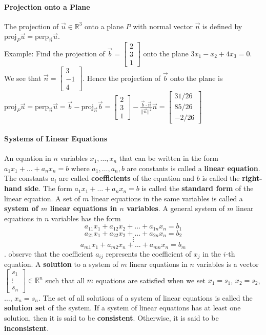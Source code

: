 \documentclass[10pt,letter]{article}
\begin{document}
\paragraph{Projection onto a Plane} The projection of $\vec{u}\in\mathbb{R}^3$ onto a plane $P$ with normal vector $\vec{n}$ is defined by $\text{proj}_P\vec{u}=\text{perp}_{\vec{n}}\vec{u}$. \\ 
Example: Find the projection of $\vec{b}=\begin{bmatrix}2\\3\\1\end{bmatrix}$ onto the plane $3x_1-x_2+4x_3=0$. \\ 
We see that $\vec{n}=\begin{bmatrix}3\\-1\\4\end{bmatrix}$. Hence the projection of $\vec{b}$ onto the plane is $\text{proj}_P\vec{u}=\text{perp}_{\vec{n}}\vec{u}=\vec{b}-\text{proj}_{\vec{n}}\vec{b}=\begin{bmatrix}2\\3\\1\end{bmatrix}-\frac{\vec{b}\cdot\vec{n}}{||\vec{n}||^2}\vec{n}=\begin{bmatrix}31/26\\85/26\\-2/26\end{bmatrix}$

\paragraph{Systems of Linear Equations} An equation in $n$ variables $x_1,\ldots,x_n$ that can be written in the form $a_1x_1+\ldots+a_nx_n=b$ where $a_1,\ldots,a_n,b$ are constants is called a \textbf{linear equation}. The constants $a_i$ are called \textbf{coefficients} of the equation and $b$ is called the \textbf{right-hand side}. The form $a_1x_1+\ldots+a_nx_n=b$ is called the \textbf{standard form} of the linear equation. A set of $m$ linear equations in the same variables is called a \textbf{system of $m$ linear equations in $n$ variables}. A general system of $m$ linear equations in $n$ variables has the form $$a_{11}x_1+a_{12}x_2+\ldots+a_{1n}x_n=b_1$$ $$a_{21}x_1+a_{22}x_2+\ldots +a_{2n}x_n=b_2$$ $$\vdots$$ $$a_{m1}x_1+a_{m2}x_n+\ldots+a_{mn}x_n=b_m$$. observe that the coefficient $a_{ij}$ represents the coefficient of $x_j$ in the $i$-th equation. A \textbf{solution} to a system of $m$ linear equations in $n$ variables is a vector $\begin{bmatrix}s_1\\\vdots\\s_n\end{bmatrix}\in\mathbb{R}^n$ such that all $m$ equations are satisfied when we set $x_1=s_1$, $x_2=s_2$, $\ldots$, $x_n=s_n$. The set of all solutions of a system of linear equations is called the \textbf{solution set} of the system. If a system of linear equations has at least one solution, then it is said to be \textbf{consistent}. Otherwise, it is said to be \textbf{inconsistent}. 
\end{document}
